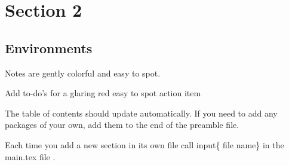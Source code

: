 \section{Section 2}

\subsection{Environments}
\begin{note}
    Notes are gently colorful and easy to spot.
\end{note}

\begin{todo}
    Add to-do's for a glaring red easy to spot action item
\end{todo}

The table of contents should update automatically. If you need to add any packages of your own, add them to the end of the preamble file.

Each time you add a new section in its own file call  input\{ file name\} in the main.tex file \cite{me}.
